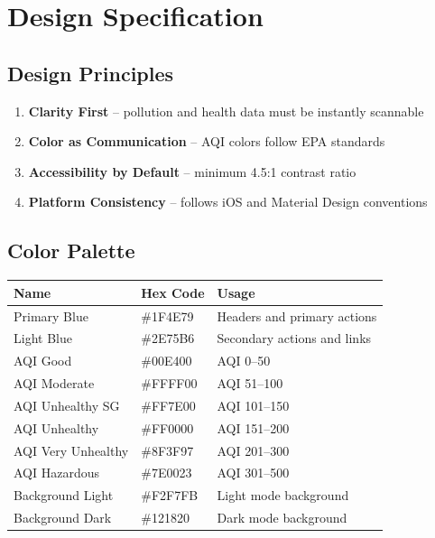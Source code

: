 \documentclass[11pt]{article}
\begin{document}
\section{Design Specification}

\subsection{Design Principles}

\begin{enumerate}
    \item \textbf{Clarity First} -- pollution and health data must be instantly scannable
    \item \textbf{Color as Communication} -- AQI colors follow EPA standards
    \item \textbf{Accessibility by Default} -- minimum 4.5:1 contrast ratio
    \item \textbf{Platform Consistency} -- follows iOS and Material Design conventions
\end{enumerate}

\subsection{Color Palette}

\begin{longtable}{|p{}|p{}|p{}|}
\hline
\textbf{Name} & \textbf{Hex Code} & \textbf{Usage} \\
\hline
Primary Blue & \#1F4E79 & Headers and primary actions \\
\hline
Light Blue & \#2E75B6 & Secondary actions and links \\
\hline
AQI Good & \#00E400 & AQI 0--50 \\
\hline
AQI Moderate & \#FFFF00 & AQI 51--100 \\
\hline
AQI Unhealthy SG & \#FF7E00 & AQI 101--150 \\
\hline
AQI Unhealthy & \#FF0000 & AQI 151--200 \\
\hline
AQI Very Unhealthy & \#8F3F97 & AQI 201--300 \\
\hline
AQI Hazardous & \#7E0023 & AQI 301--500 \\
\hline
Background Light & \#F2F7FB & Light mode background \\
\hline
Background Dark & \#121820 & Dark mode background \\
\hline
\end{longtable}
\end{document}
